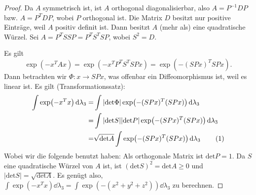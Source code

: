 \begin{proof}
	Da $A$ symmetrisch ist, ist $A$ orthogonal diagonalisierbar, also $A=P^{-1}DP$ bzw. $A=P^TDP$, wobei $P$ orthogonal ist. Die Matrix $D$ besitzt nur positive Einträge, weil $A$ positiv definit ist. Dann besitzt $A$ (mehr als) eine quadratische Würzel. Sei $A=P^TSSP=P^TS^TSP$, wobei $S^2=D$. 

	Es gilt
	\[
	\exp(-x^TAx)=\exp(-x^TP^TS^TSPx)=\exp(-(SPx)^TSPx)
	.\] 
	Dann betrachten wir $\Phi:x\to SPx$, was offenbar ein Diffeomorphismus ist, weil es linear ist. Es gilt (Transformationssatz):
	\begin{align*}
		\int \exp(-x^Tx)\dd{\lambda_3}=&\int |\text{det}\Phi|\exp(-(SPx)^T(SPx))\dd{\lambda_3}\\
		=&\int |\text{det}S| |\text{det}P|\exp(-(SPx)^T(SPx))\dd{\lambda_3}\\
		=&\sqrt{\text{det}A} \int \exp(-(SPx)^T(SPx))\dd{\lambda_3}\addtocounter{equation}{1}\tag{\theequation}\label{eq:advanalblatt10-1}
	\end{align*}
	Wobei wir die folgende benutzt haben: Als orthogonale Matrix ist $\text{det}P=1$. Da $S$ eine quadratische Würzel von $A$ ist, ist $(\text{det}S)^2=\text{det}A\ge 0$ und $|\text{det}S|=\sqrt{\text{det}A} $. Es genügt also, $\int \exp(-x^Tx)\dd{\lambda_3}=\int\exp(-(x^2+y^2+z^2))\dd{\lambda_3}$ zu berechnen.


\end{proof}
